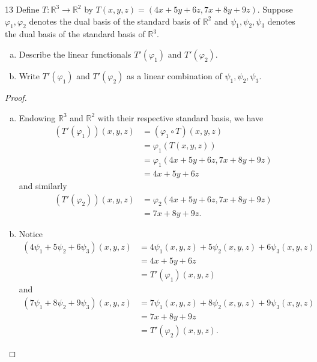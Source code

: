 \documentclass{extarticle}
\newenvironment{problem}[1]{\begin{prob*}{#1}{}}{\end{prob*}}
\newcommand{\R}{\mathbb{R}}
\begin{document}
\begin{problem}{13}
Define $T:\R^3\to\R^2$ by $T(x,y,z) = (4x + 5y + 6z, 7x + 8y + 9z)$.  Suppose $\varphi_1,\varphi_2$ denotes the dual basis of the standard basis of $\R^2$ and $\psi_1,\psi_2,\psi_3$ denotes the dual basis of the standard basis of $\R^3$.  
\begin{enumerate}[(a)]
\item Describe the linear functionals $T'(\varphi_1)$ and $T'(\varphi_2)$.
\item Write $T'(\varphi_1)$ and $T'(\varphi_2)$ as a linear combination of $\psi_1,\psi_2,\psi_3$.  
\end{enumerate}
\end{problem}
\begin{proof}
\begin{enumerate}[(a)]
\item Endowing $\R^3$ and $\R^2$ with their respective standard basis, we have
\begin{align*}
(T'(\varphi_1))(x, y, z) &= (\varphi_1\circ T)(x, y, z)\\
&= \varphi_1(T(x, y, z))\\
&= \varphi_1(4x + 5y + 6z, 7x + 8y + 9z)\\
&= 4x + 5y + 6z
\end{align*}
and similarly
\begin{align*}
(T'(\varphi_2))(x, y, z) &= \varphi_2(4x + 5y + 6z, 7x + 8y + 9z)\\
&= 7x + 8y + 9z.
\end{align*}
\item Notice
\begin{align*}
(4\psi_1 + 5\psi_2 + 6\psi_3)(x, y, z) &= 4\psi_1(x,y,z) + 5\psi_2(x,y,z) + 6\psi_3(x,y,z) \\
&= 4x + 5y + 6z\\
&= T'(\varphi_1)(x, y, z)
\end{align*}
and 
\begin{align*}
(7\psi_1 + 8\psi_2 + 9\psi_3)(x, y, z) &= 7\psi_1(x,y,z) + 8\psi_2(x,y,z) + 9\psi_3(x,y,z) \\
&= 7x + 8y + 9z\\
&= T'(\varphi_2)(x, y, z).
\end{align*}
\end{enumerate}
\end{proof}
\end{document}
